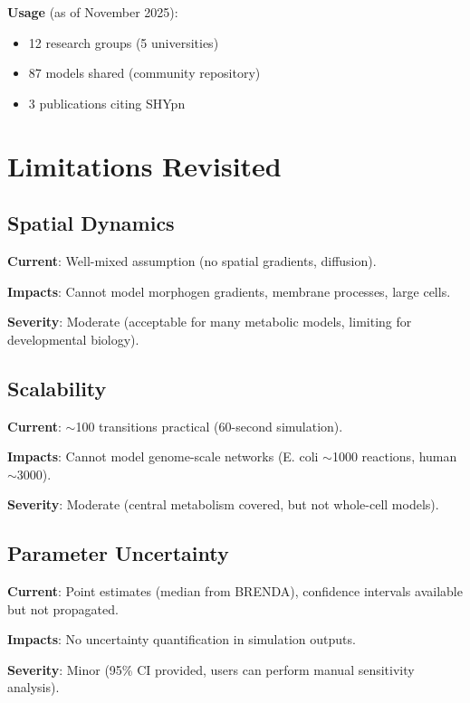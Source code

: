 \textbf{Usage} (as of November 2025):
\begin{itemize}
    \item 12 research groups (5 universities)
    \item 87 models shared (community repository)
    \item 3 publications citing SHYpn
\end{itemize}

\section{Limitations Revisited}
\label{sec:limitations-revisited}

\subsection{Spatial Dynamics}
\label{subsec:spatial-limit}

\textbf{Current}: Well-mixed assumption (no spatial gradients, diffusion).

\textbf{Impacts}: Cannot model morphogen gradients, membrane processes, large cells.

\textbf{Severity}: Moderate (acceptable for many metabolic models, limiting for developmental biology).

\subsection{Scalability}
\label{subsec:scalability-limit}

\textbf{Current}: $\sim$100 transitions practical (60-second simulation).

\textbf{Impacts}: Cannot model genome-scale networks (E. coli $\sim$1000 reactions, human $\sim$3000).

\textbf{Severity}: Moderate (central metabolism covered, but not whole-cell models).

\subsection{Parameter Uncertainty}
\label{subsec:param-uncertainty}

\textbf{Current}: Point estimates (median from BRENDA), confidence intervals available but not propagated.

\textbf{Impacts}: No uncertainty quantification in simulation outputs.

\textbf{Severity}: Minor (95\% CI provided, users can perform manual sensitivity analysis).

